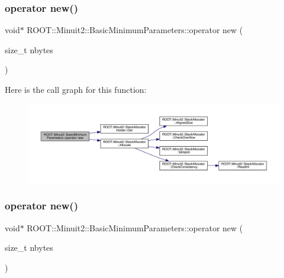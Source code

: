 \subsubsection{\texorpdfstring{operator new()}{operator new()}\hspace{0.1cm}{\footnotesize\ttfamily [1/2]}}
{\footnotesize\ttfamily void$\ast$ R\+O\+O\+T\+::\+Minuit2\+::\+Basic\+Minimum\+Parameters\+::operator new (\begin{DoxyParamCaption}\item[{size\+\_\+t}]{nbytes }\end{DoxyParamCaption})\hspace{0.3cm}{\ttfamily [inline]}}

Here is the call graph for this function\+:
\nopagebreak
\begin{figure}[H]
\begin{center}
\leavevmode
\includegraphics[width=350pt]{da/d30/classROOT_1_1Minuit2_1_1BasicMinimumParameters_a5258a9959c0b6ff699a9200dad4caee0_cgraph}
\end{center}
\end{figure}
\mbox{\label{classROOT_1_1Minuit2_1_1BasicMinimumParameters_a5258a9959c0b6ff699a9200dad4caee0}} 
\subsubsection{\texorpdfstring{operator new()}{operator new()}\hspace{0.1cm}{\footnotesize\ttfamily [2/2]}}
{\footnotesize\ttfamily void$\ast$ R\+O\+O\+T\+::\+Minuit2\+::\+Basic\+Minimum\+Parameters\+::operator new (\begin{DoxyParamCaption}\item[{size\+\_\+t}]{nbytes }\end{DoxyParamCaption})\hspace{0.3cm}{\ttfamily [inline]}}

